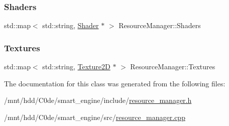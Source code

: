\subsubsection{\texorpdfstring{Shaders}{Shaders}}
{\footnotesize\ttfamily std\+::map$<$ std\+::string, \hyperlink{classShader}{Shader} $\ast$ $>$ Resource\+Manager\+::\+Shaders\hspace{0.3cm}{\ttfamily [static]}}

\mbox{\label{classResourceManager_a0a62bc298e457b4b55d185503aa35937}} 
\subsubsection{\texorpdfstring{Textures}{Textures}}
{\footnotesize\ttfamily std\+::map$<$ std\+::string, \hyperlink{classTexture2D}{Texture2D} $\ast$ $>$ Resource\+Manager\+::\+Textures\hspace{0.3cm}{\ttfamily [static]}}



The documentation for this class was generated from the following files\+:\begin{DoxyCompactItemize}
\item 
/mnt/hdd/\+C0de/smart\+\_\+engine/include/\hyperlink{resource__manager_8h}{resource\+\_\+manager.\+h}\item 
/mnt/hdd/\+C0de/smart\+\_\+engine/src/\hyperlink{resource__manager_8cpp}{resource\+\_\+manager.\+cpp}\end{DoxyCompactItemize}

